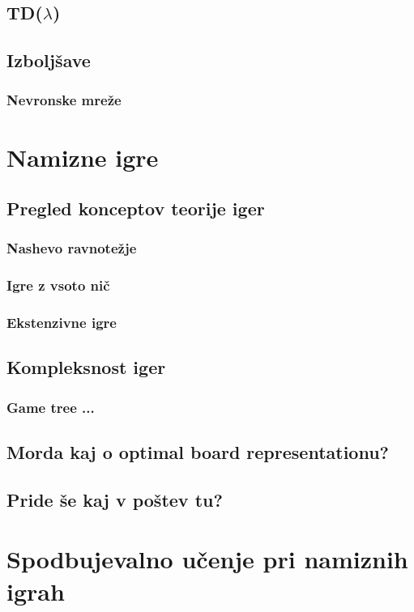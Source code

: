 \documentclass[12pt,a4paper]{amsart}
\theoremstyle{definition} %
\theoremstyle{plain} %
\begin{document}
\subsection{TD($\lambda$)}

\subsection{Izboljšave}
\subsubsection{Nevronske mreže}


\section{Namizne igre}

\subsection{Pregled konceptov teorije iger}
\subsubsection{Nashevo ravnotežje}
\subsubsection{Igre z vsoto nič}
\subsubsection{Ekstenzivne igre}

\subsection{Kompleksnost iger}
\subsubsection{Game tree ...}

\subsection{Morda kaj o optimal board representationu?}
\subsection{Pride še kaj v poštev tu?}


\section{Spodbujevalno učenje pri namiznih igrah}
\end{document}
